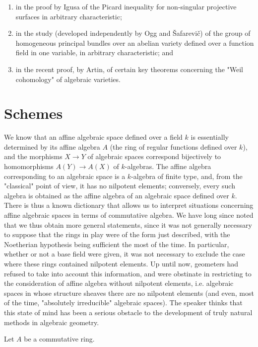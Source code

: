   \begin{enumerate}\item{}in the proof by Igusa of the Picard inequality for non-singular projective surfaces in arbitrary characteristic;

    \item{}in the study (developed independently by Ogg and Šafarevič) of the group of homogeneous principal bundles over an abelian variety defined over a function field in one variable, in arbitrary characteristic; and

    \item{}in the recent proof, by Artin, of certain key theorems concerning the "Weil cohomology" of algebraic varieties.\end{enumerate}\chapter{Schemes}\thispagestyle{fancy}\label{fga2-1}\par{}We know that an affine algebraic space defined over a field \(k\) is essentially determined by its affine algebra \(A\) (the ring of regular functions defined over \(k\)), and the morphisms \(X\to  Y\) of algebraic spaces correspond bijectively to homomorphisms \(A(Y)\to  A(X)\) of \(k\)-algebras.
  The affine algebra corresponding to an algebraic space is a \(k\)-algebra of finite type, and, from the "classical" point of view, it has no nilpotent elements;
  conversely, every such algebra is obtained as the affine algebra of an algebraic space defined over \(k\).
  There is thus a known dictionary that allows us to interpret situations concerning affine algebraic spaces in terms of commutative algebra.
  We have long since noted that we thus obtain more general statements, since it was not generally necessary to suppose that the rings in play were of the form just described, with the Noetherian hypothesis being sufficient the most of the time.
  In particular, whether or not a base field were given, it was not necessary to exclude the case where these rings contained nilpotent elements.
  Up until now, geometers had refused to take into account this information, and were obstinate in restricting to the consideration of affine algebra without nilpotent elements, i.e. algebraic spaces in whose structure sheaves there are no nilpotent elements (and even, most of the time, "absolutely irreducible" algebraic spaces).
  The speaker thinks that this state of mind has been a serious obstacle to the development of truly natural methods in algebraic geometry.\par{}Let \(A\) be a commutative ring.
